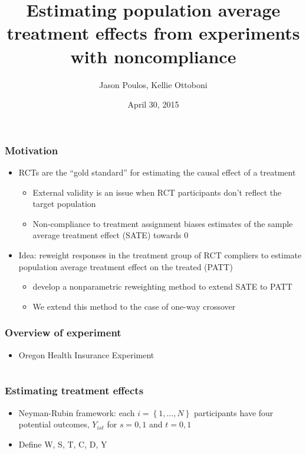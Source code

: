 \documentclass{beamer}
\title[]{Estimating population average treatment effects from experiments with noncompliance}
\author[J. Poulos, K. Ottoboni]{Jason Poulos, Kellie Ottoboni}
\institute[]{Stat 215B}
\date[04/30/15]{April 30, 2015}
\begin{document}
\frame{\titlepage}

\section[Introduction]{}

\begin{frame}
\frametitle{Motivation}
\begin{itemize}
\item RCTs are the ``gold standard'' for estimating the causal effect of a treatment
\begin{itemize}
\item External validity is an issue when RCT participants don't reflect the target population
\item Non-compliance to treatment assignment biases estimates of the sample average treatment effect (SATE) towards $0$
\end{itemize}
\item Idea: reweight responses in the treatment group of RCT compliers to estimate population average treatment effect on the treated (PATT)
\begin{itemize}
\item \cite{Hartman} develop a nonparametric reweighting method to extend SATE to PATT
\item We extend this method to the case of one-way crossover
\end{itemize}
\end{itemize}
\end{frame}



\begin{frame}
\frametitle{Overview of experiment}
\begin{itemize}
\item Oregon Health Insurance Experiment

\end{itemize}
\end{frame}

\section[Estimation]{}

\begin{frame}
\frametitle{Estimating treatment effects}
\begin{itemize}
\item Neyman-Rubin framework: each $i = \left\{1, ..., N \right\}$ participants have four potential outcomes, $Y_{ist}$ for $s = 0,1$ and $t = 0,1$
\item Define W, S, T, C, D, Y
\end{itemize}
\end{frame}
\end{document}
